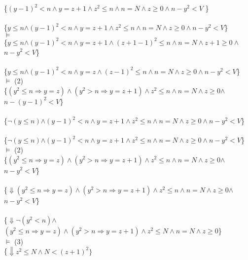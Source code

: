 \documentclass[11.5pt]{article}
\begin{document}
\\
 \\
\{$(y-1)^2<n \land y = z+1\land z^2 \leq n \land n=N \land z\geq 0\land$\colorbox{teal!10}{$n-y^2<V$} \}
\\
 \\
\{\colorbox{NavyBlue!10}{$y \leq n$}$\land (y-1)^2<n \land y = z+1\land z^2 \leq n \land n=N \land z\geq 0\land$\colorbox{teal!10}{$n-y^2<V$}\} \\
$\vDash$ \\
\{\colorbox{NavyBlue!10}{$y \leq n$}$\land (y-1)^2<n \land y = z+1\land (z+1-1)^2 \leq n \land n=N \land z+1 \geq 0\land$\colorbox{teal!10}{$n-y^2<V$}\}
\\
 \\
\{\colorbox{NavyBlue!10}{$y \leq n$}$\land (y-1)^2<n \land y = z\land (z-1)^2 \leq n \land n=N \land z \geq 0\land$\colorbox{teal!10}{$n-y^2<V$}\}\\
$\vDash$ (2) \\
\{\colorbox{blue!10}{$(y^2 \leq n \Rightarrow y = z) \land (y^2 > n \Rightarrow y = z + 1) \land z^2 \leq n \land n=N \land z \geq 0$}$\land$\colorbox{teal!10}{$n-(y-1)^2<V$}\} 
\\
 \\
\{\colorbox{NavyBlue!10}{$\lnot(y \leq n)$}$\land (y-1)^2<n \land y = z+ 1 \land z^2 \leq n \land n=N \land z \geq 0\land$\colorbox{teal!10}{$n-y^2<V$}\}
\\
 \\
\{\colorbox{NavyBlue!10}{$\lnot(y \leq n)$}$\land (y-1)^2<n \land y = z+ 1 \land z^2 \leq n \land n=N \land z \geq 0\land$\colorbox{teal!10}{$n-y^2<V$}\}\\
$\vDash$ (2) \\
\{\colorbox{blue!10}{$(y^2 \leq n \Rightarrow y = z) \land (y^2 > n \Rightarrow y = z + 1) \land z^2 \leq n \land n=N \land z \geq 0$}$\land$\colorbox{teal!10}{$n-y^2<V$}\} 
\\
 \\
\{$\Downarrow$\colorbox{blue!10}{$(y^2 \leq n \Rightarrow y = z) \land (y^2 > n \Rightarrow y = z + 1) \land z^2 \leq n \land n=N \land z \geq 0$}$\land$\colorbox{teal!10}{$n-y^2<V$}\}
\\
 \\
\{$\Downarrow$\colorbox{magenta!10}{$\lnot (y^2 < n)$}$\land$\colorbox{blue!10}{$(y^2 \leq n \Rightarrow y = z) \land (y^2 > n \Rightarrow y = z + 1) \land z^2 \leq N \land n=N \land z \geq 0$}\} \\
$\vDash$ (3) \\
\{$\Downarrow z^2 \leq N \land N < (z+1)^2\}$
\end{document}
